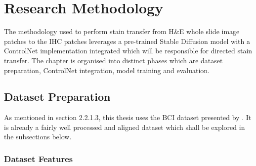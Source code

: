 
\chapter{Research Methodology} %



\ifpdf
    \graphicspath{{4_ResearchMethodology/figures/PNG/}{4_ResearchMethodology/figures/PDF/}{4_ResearchMethodology/figures/}}
\else
    \graphicspath{{4_ResearchMethodology/figures/EPS/}{4_ResearchMethodology/figures/}}
\fi



The methodology used to perform stain transfer from H\&E whole slide image patches to the IHC patches leverages a pre-trained Stable Diffusion model with a ControlNet implementation integrated which will be responsible for directed stain transfer. The chapter is organised into distinct phases which are dataset preparation, ControlNet integration, model training and evaluation.

\section{Dataset Preparation}

As mentioned in section 2.2.1.3, this thesis uses the BCI dataset presented by \parencite{Liu2022BCI:Pix2pix}. It is already a fairly well processed and aligned dataset which shall be explored in the subsections below.

\subsection{Dataset Features}

